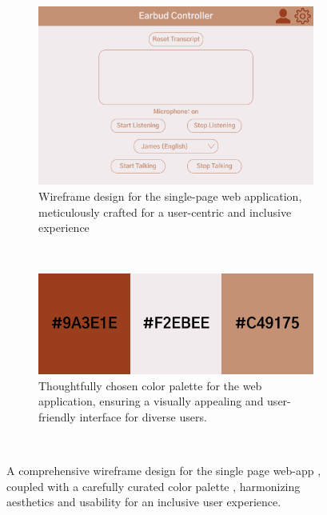 \documentclass{l4proj}
\begin{document}
\begin{figure}
    \centering
    \begin{subfigure}[b]{0.60\textwidth}
        \includegraphics[width=\textwidth]{dissertation/images/Home.png}
        \caption{Wireframe design for the single-page web application, meticulously crafted for a user-centric and inclusive experience}
        \label{fig:home}
    \end{subfigure}
    ~ %
    \begin{subfigure}[b]{0.30\textwidth}
        \includegraphics[width=\textwidth]{dissertation/images/colours.png}
        \caption{Thoughtfully chosen color palette for the web application, ensuring a visually appealing and user-friendly interface for diverse users.}
        \label{fig:colours}
    \end{subfigure}
    ~ %
    \caption{A comprehensive wireframe design for the single page web-app , coupled with a carefully curated color palette , harmonizing aesthetics and usability for an inclusive user experience.}
    \label{fig:wireframe}
\end{figure}
\end{document}
